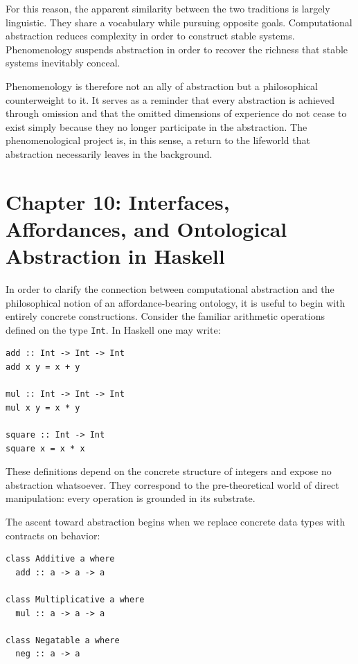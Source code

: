 \documentclass[12pt,letterpaper]{article}
\theoremstyle{remark}
\begin{document}
For this reason, the apparent similarity between the two traditions is largely linguistic. They share a vocabulary while pursuing opposite goals. Computational abstraction reduces complexity in order to construct stable systems. Phenomenology suspends abstraction in order to recover the richness that stable systems inevitably conceal.

Phenomenology is therefore not an ally of abstraction but a philosophical counterweight to it. It serves as a reminder that every abstraction is achieved through omission and that the omitted dimensions of experience do not cease to exist simply because they no longer participate in the abstraction. The phenomenological project is, in this sense, a return to the lifeworld that abstraction necessarily leaves in the background.

\newpage

\section{Chapter 10: Interfaces, Affordances, and Ontological Abstraction in Haskell}

In order to clarify the connection between computational abstraction and the philosophical notion of an affordance-bearing ontology, it is useful to begin with entirely concrete constructions. Consider the familiar arithmetic operations defined on the type \texttt{Int}. In Haskell one may write:
\begin{verbatim}
add :: Int -> Int -> Int
add x y = x + y

mul :: Int -> Int -> Int
mul x y = x * y

square :: Int -> Int
square x = x * x
\end{verbatim}

These definitions depend on the concrete structure of integers and expose no abstraction whatsoever. They correspond to the pre-theoretical world of direct manipulation: every operation is grounded in its substrate.

The ascent toward abstraction begins when we replace concrete data types with contracts on behavior:
\begin{verbatim}
class Additive a where
  add :: a -> a -> a

class Multiplicative a where
  mul :: a -> a -> a

class Negatable a where
  neg :: a -> a
\end{verbatim}
\end{document}
